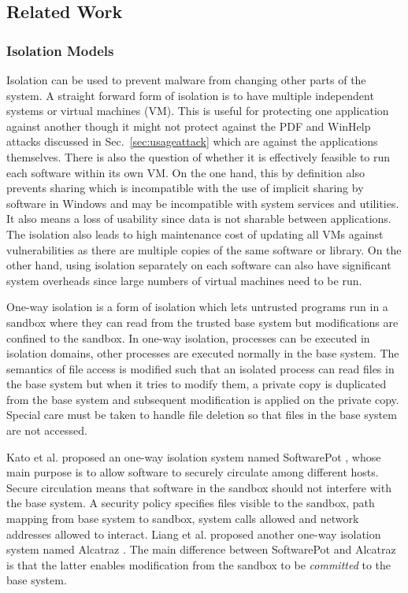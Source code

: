 \subsection{Related Work}
\label{sec:prevworks}


\subsubsection{Isolation Models}

Isolation can be used to prevent malware from changing
other parts of the system.
A straight forward form of isolation is to have 
multiple independent systems or virtual machines (VM).
This is useful for protecting one application against another though
it might not protect against the PDF and WinHelp attacks discussed in
Sec.~\ref{sec:usageattack} which are against the applications themselves.
There is also the question of whether it is effectively feasible to 
run each software within its own VM.
On the one hand,
this by definition also prevents sharing which is incompatible
with the use of implicit sharing by software in Windows and
may be incompatible with system services and utilities.
It also means a loss of usability since data is not sharable
between applications.
The isolation also leads to high
maintenance cost of updating all VMs against
vulnerabilities as there are multiple copies of
the same software or library.
On the other hand, using isolation separately on each software can also
have significant system overheads since large numbers of virtual machines
need to be run.

One-way isolation is a form of isolation which
lets untrusted programs run in a sandbox where they can read from the
trusted base system but modifications are confined to the sandbox.
In one-way isolation, processes can be executed in isolation domains,
other processes are executed normally in the base system.
The semantics of file access is modified such that an isolated process
can read files in the base system but when it tries to modify them,
a private copy is duplicated from the base system and subsequent modification
is applied on the private copy.
Special care must be taken to handle file deletion so that files in the
base system are not accessed.

Kato et al. proposed an one-way isolation system named
SoftwarePot \cite{softwarepot},
whose main purpose is to allow software to securely circulate among
different hosts.
Secure circulation means that software in the sandbox should not interfere
with the base system.
A security policy specifies files visible to the sandbox,
path mapping from base system to sandbox, system calls allowed and
network addresses allowed to interact.
Liang et al. proposed another one-way isolation system named
Alcatraz \cite{alcatraz}.
The main difference between SoftwarePot and Alcatraz is that the latter
enables modification from the sandbox to be {\em committed} to the base
system.

